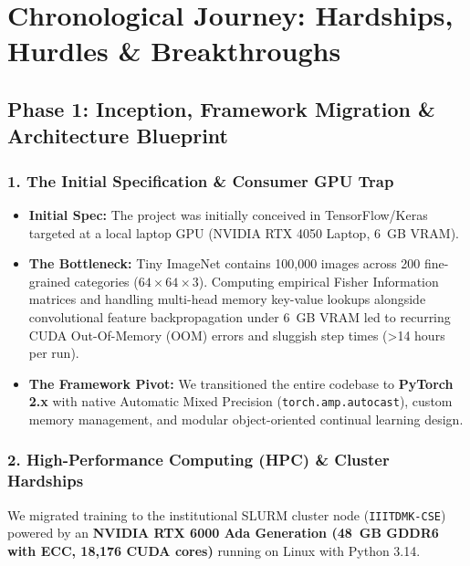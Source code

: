 \documentclass[11pt,a4paper]{article}
\begin{document}
    \section{Chronological Journey: Hardships, Hurdles \& Breakthroughs}
    \label{sec:chronological-journey}

    \subsection{Phase 1: Inception, Framework Migration \& Architecture Blueprint}

    \subsubsection{1. The Initial Specification \& Consumer GPU Trap}
    \begin{itemize}[leftmargin=*]
        \item \textbf{Initial Spec:} The project was initially conceived in TensorFlow/Keras targeted at a local laptop GPU (NVIDIA RTX 4050 Laptop, 6~GB VRAM).
        \item \textbf{The Bottleneck:} Tiny ImageNet contains 100,000 images across 200 fine-grained categories ($64 \times 64 \times 3$). Computing empirical Fisher Information matrices and handling multi-head memory key-value lookups alongside convolutional feature backpropagation under 6~GB VRAM led to recurring CUDA Out-Of-Memory (OOM) errors and sluggish step times (>14 hours per run).
        \item \textbf{The Framework Pivot:} We transitioned the entire codebase to \textbf{PyTorch 2.x} with native Automatic Mixed Precision (\texttt{torch.amp.autocast}), custom memory management, and modular object-oriented continual learning design.
    \end{itemize}

    \subsubsection{2. High-Performance Computing (HPC) \& Cluster Hardships}
    We migrated training to the institutional SLURM cluster node (\texttt{IIITDMK-CSE}) powered by an \textbf{NVIDIA RTX 6000 Ada Generation (48~GB GDDR6 with ECC, 18,176 CUDA cores)} running on Linux with Python 3.14.
\end{document}
